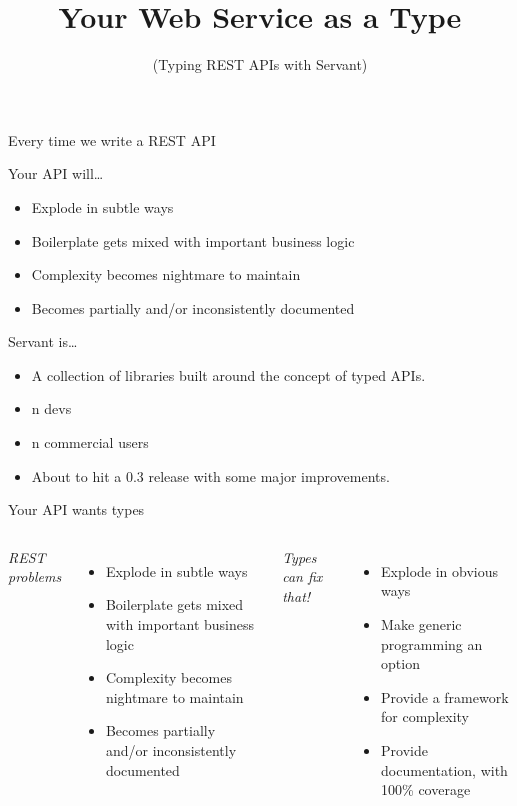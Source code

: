 \documentclass[ignorenonframetext,]{beamer}
\title{Your Web Service as a Type}
\author{(Typing REST APIs with Servant)}
\date{}
\begin{document}
\frame{\titlepage}

\begin{frame}{Every time we write a REST API}

Your API will\ldots{}

\begin{itemize}[<+->]
\itemsep1pt\parskip0pt
\item
  Explode in subtle ways
\item
  Boilerplate gets mixed with important business logic
\item
  Complexity becomes nightmare to maintain
\item
  Becomes partially and/or inconsistently documented
\end{itemize}

\end{frame}

\begin{frame}{Servant is\ldots{}}

\begin{itemize}[<+->]
\itemsep1pt\parskip0pt
\item
  A collection of libraries built around the concept of typed APIs.
\item
  n devs
\item
  n commercial users
\item
  About to hit a 0.3 release with some major improvements.
\end{itemize}

\end{frame}

\begin{frame}{Your API wants types}

\begin{columns}


\emph{REST problems}

\begin{itemize}[<+->]
\itemsep1pt\parskip0pt
\item
  Explode in subtle ways
\item
  Boilerplate gets mixed with important business logic
\item
  Complexity becomes nightmare to maintain
\item
  Becomes partially and/or inconsistently documented
\end{itemize}


\emph{Types can fix that!}

\begin{itemize}[<+->]
\itemsep1pt\parskip0pt
\item
  Explode in obvious ways
\item
  Make generic programming an option
\item
  Provide a framework for complexity
\item
  Provide documentation, with 100\% coverage
\end{itemize}

\end{columns}

\end{frame}
\end{document}
